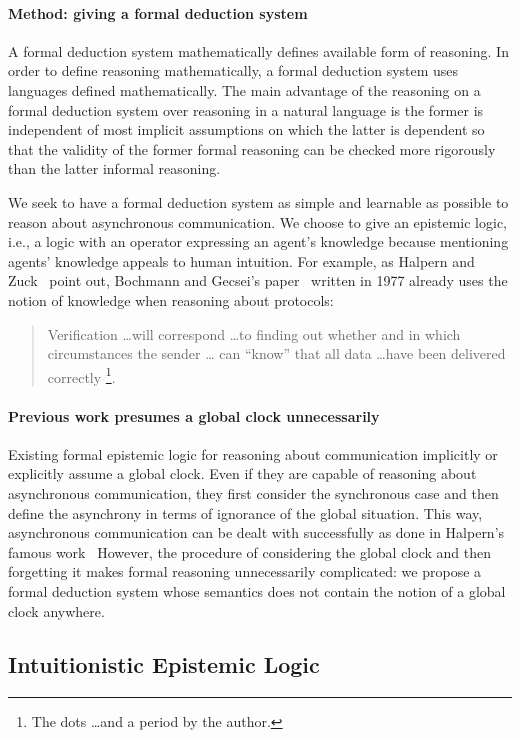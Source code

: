 \paragraph{Method: giving a formal deduction system}
A formal deduction system mathematically defines
available form of reasoning.
In order to define reasoning mathematically,
a formal deduction system uses languages defined mathematically.
The main advantage of the reasoning on a formal deduction system over
reasoning in a natural language
is the former is independent of most implicit assumptions
on which the latter is dependent so that
the validity of the former formal reasoning can be checked more rigorously
 than the latter informal reasoning.

We seek to have a formal
deduction system as simple and learnable as possible to reason about asynchronous
communication.
We choose to give an epistemic logic, i.e., a logic with an operator expressing an agent's
knowledge because mentioning agents' knowledge appeals to
human intuition.
For example, as Halpern and Zuck~\cite{halpern1992little}
 point out, Bochmann and Gecsei's paper~\cite{bochmann} written in 1977 already uses
 the notion of knowledge when reasoning about protocols:
\begin{quotation}
\noindent
 Verification \ldots will correspond
\ldots to finding out whether and in
which circumstances the sender \ldots
 can ``know'' that all data \ldots have been delivered correctly%
\footnote{The dots \ldots and a period by the author.}.
\end{quotation}

\paragraph{Previous work presumes a global clock unnecessarily}
Existing formal epistemic logic for reasoning about communication implicitly or
explicitly assume a global clock. Even if they are capable of reasoning about
asynchronous communication, they first consider the synchronous case and then define the
asynchrony in terms of ignorance of the global situation.
This way, asynchronous communication can be dealt with successfully as done in Halpern's
famous work~\cite{halpern1985formal,fagin2003reasoning}
However, the procedure of
considering the global clock and then forgetting it
makes formal reasoning unnecessarily complicated:
we propose a formal deduction system whose semantics does not contain the notion of
a global clock anywhere.

\subsection{Intuitionistic Epistemic Logic}

